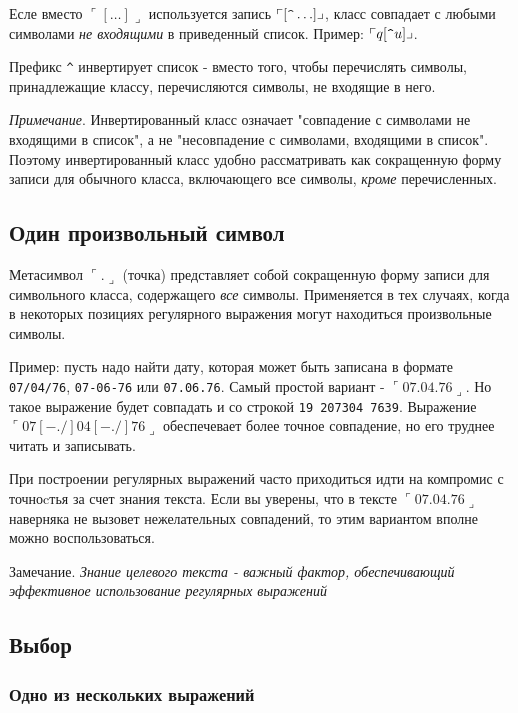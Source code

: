 Есле вместо $\ulcorner[\ldots]\lrcorner$ используется запись $\ulcorner[\verb+^+\ldots]\lrcorner$, класс совпадает с любыми символами \emph{не входящими} в приведенный список. Пример: $\ulcorner q[\verb+^+u]\lrcorner$.

Префикс  \verb+^+ инвертирует список - вместо того, чтобы перечислять символы, принадлежащие классу, перечисляются символы, не входящие в него.

\emph{Примечание}. Инвертированный класс означает "совпадение с символами не входящими в список", а не "несовпадение с символами, входящими в список". Поэтому инвертированный класс удобно рассматривать как сокращенную форму записи для обычного класса, включающего все символы, \emph{кроме} перечисленных.

\subsection{Один произвольный символ}

Метасимвол $\ulcorner . \lrcorner$ (точка) представляет собой сокращенную форму записи для символьного класса, содержащего \emph{все} символы. Применяется в тех случаях, когда в некоторых позициях регулярного выражения могут находиться произвольные символы.

Пример: пусть надо найти дату, которая может быть записана в формате \verb+07/04/76+, \verb+07-06-76+ или \verb+07.06.76+. Самый простой вариант - $\ulcorner 07.04.76 \lrcorner$. Но такое выражение будет совпадать и со строкой \verb+19 207304 7639+. Выражение $\ulcorner 07[-./]04[-./]76 \lrcorner$ обеспечевает более точное совпадение, но его труднее читать и записывать.

При построении регулярных выражений часто приходиться идти на компромис с точноcтья за счет знания текста. Если вы уверены, что в тексте $\ulcorner 07.04.76 \lrcorner$ наверняка не вызовет нежелательных совпадений, то этим вариантом вполне можно воспользоваться. 

Замечание. \emph{Знание целевого текста - важный фактор, обеспечивающий эффективное использование регулярных выражений}

\subsection{Выбор}
\subsubsection{Одно из нескольких выражений}

